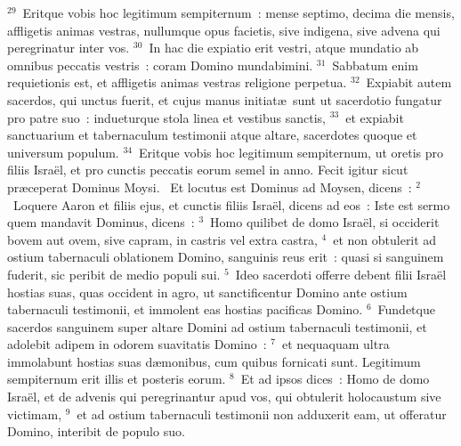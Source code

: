 ${}^{29}$~Eritque vobis hoc legitimum sempiternum~: mense septimo, decima die mensis, affligetis animas vestras, nullumque opus facietis, sive indigena, sive advena qui peregrinatur inter vos.
${}^{30}$~In hac die expiatio erit vestri, atque mundatio ab omnibus peccatis vestris~: coram Domino mundabimini.
${}^{31}$~Sabbatum enim requietionis est, et affligetis animas vestras religione perpetua.
${}^{32}$~Expiabit autem sacerdos, qui unctus fuerit, et cujus manus initiat\ae\ sunt ut sacerdotio fungatur pro patre suo~: indueturque stola linea et vestibus sanctis,
${}^{33}$~et expiabit sanctuarium et tabernaculum testimonii atque altare, sacerdotes quoque et universum populum.
${}^{34}$~Eritque vobis hoc legitimum sempiternum, ut oretis pro filiis Isra\"el, et pro cunctis peccatis eorum semel in anno. Fecit igitur sicut pr\ae ceperat Dominus Moysi.
~Et locutus est Dominus ad Moysen, dicens~:
${}^{2}$~Loquere Aaron et filiis ejus, et cunctis filiis Isra\"el, dicens ad eos~: Iste est sermo quem mandavit Dominus, dicens~:
${}^{3}$~Homo quilibet de domo Isra\"el, si occiderit bovem aut ovem, sive capram, in castris vel extra castra,
${}^{4}$~et non obtulerit ad ostium tabernaculi oblationem Domino, sanguinis reus erit~: quasi si sanguinem fuderit, sic peribit de medio populi sui.
${}^{5}$~Ideo sacerdoti offerre debent filii Isra\"el hostias suas, quas occident in agro, ut sanctificentur Domino ante ostium tabernaculi testimonii, et immolent eas hostias pacificas Domino.
${}^{6}$~Fundetque sacerdos sanguinem super altare Domini ad ostium tabernaculi testimonii, et adolebit adipem in odorem suavitatis Domino~:
${}^{7}$~et nequaquam ultra immolabunt hostias suas d\ae monibus, cum quibus fornicati sunt. Legitimum sempiternum erit illis et posteris eorum.
${}^{8}$~Et ad ipsos dices~: Homo de domo Isra\"el, et de advenis qui peregrinantur apud vos, qui obtulerit holocaustum sive victimam,
${}^{9}$~et ad ostium tabernaculi testimonii non adduxerit eam, ut offeratur Domino, interibit de populo suo.



